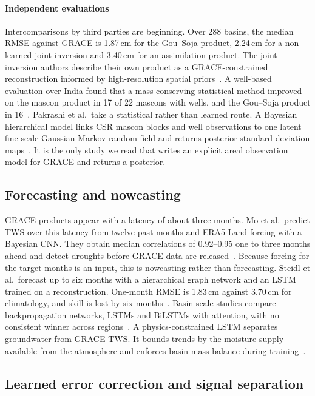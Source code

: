\paragraph{Independent evaluations} Intercomparisons by third parties are beginning. Over 288 basins, the median RMSE against GRACE is 1.87\,cm for the Gou--Soja product, 2.24\,cm for a non-learned joint inversion and 3.40\,cm for an assimilation product. The joint-inversion authors describe their own product as a GRACE-constrained reconstruction informed by high-resolution spatial priors~\cite{xiong2026sysu}. A well-based evaluation over India found that a mass-conserving statistical method improved on the mascon product in 17 of 22 mascons with wells, and the Gou--Soja product in 16~\cite{suryawanshi2026efficacy}. Pakrashi et al.\ take a statistical rather than learned route. A Bayesian hierarchical model links CSR mascon blocks and well observations to one latent fine-scale Gaussian Markov random field and returns posterior standard-deviation maps~\cite{pakrashi2026highplains}. It is the only study we read that writes an explicit areal observation model for GRACE and returns a posterior.

\subsection{Forecasting and nowcasting}

GRACE products appear with a latency of about three months. Mo et al.\ predict TWS over this latency from twelve past months and ERA5-Land forcing with a Bayesian CNN. They obtain median correlations of 0.92--0.95 one to three months ahead and detect droughts before GRACE data are released~\cite{mo2025nearrealtime}. Because forcing for the target months is an input, this is nowcasting rather than forecasting. Steidl et al.\ forecast up to six months with a hierarchical graph network and an LSTM trained on a reconstruction. One-month RMSE is 1.83\,cm against 3.70\,cm for climatology, and skill is lost by six months~\cite{steidl2026hignn}. Basin-scale studies compare backpropagation networks, LSTMs and BiLSTMs with attention, with no consistent winner across regions~\cite{lu2024changes}. A physics-constrained LSTM separates groundwater from GRACE TWS. It bounds trends by the moisture supply available from the atmosphere and enforces basin mass balance during training~\cite{sarkar2026physics}.

\subsection{Learned error correction and signal separation}


